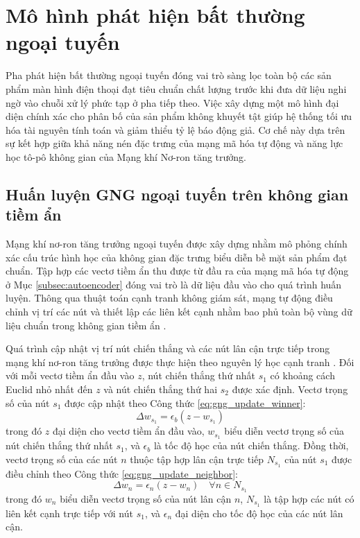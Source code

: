 \section{Mô hình phát hiện bất thường ngoại tuyến}
\label{sec:mo_hinh_bat_thuong_ngoai_tuyen}

Pha phát hiện bất thường ngoại tuyến đóng vai trò sàng lọc toàn bộ các sản phẩm màn hình điện thoại đạt tiêu chuẩn chất lượng trước khi đưa dữ liệu nghi ngờ vào chuỗi xử lý phức tạp ở pha tiếp theo. Việc xây dựng một mô hình đại diện chính xác cho phân bố của sản phẩm không khuyết tật giúp hệ thống tối ưu hóa tài nguyên tính toán và giảm thiểu tỷ lệ báo động giả. Cơ chế này dựa trên sự kết hợp giữa khả năng nén đặc trưng của mạng mã hóa tự động và năng lực học tô-pô không gian của Mạng khí Nơ-ron tăng trưởng.

\subsection{Huấn luyện GNG ngoại tuyến trên không gian tiềm ẩn}
\label{subsec:huan_luyen_gng_ngoai_tuyen}

Mạng khí nơ-ron tăng trưởng ngoại tuyến được xây dựng nhằm mô phỏng chính xác cấu trúc hình học của không gian đặc trưng biểu diễn bề mặt sản phẩm đạt chuẩn. Tập hợp các vectơ tiềm ẩn thu được từ đầu ra của mạng mã hóa tự động ở Mục \ref{subsec:autoencoder} đóng vai trò là dữ liệu đầu vào cho quá trình huấn luyện. Thông qua thuật toán cạnh tranh không giám sát, mạng tự động điều chỉnh vị trí các nút và thiết lập các liên kết cạnh nhằm bao phủ toàn bộ vùng dữ liệu chuẩn trong không gian tiềm ẩn \cite{fritzke1995growing}.

Quá trình cập nhật vị trí nút chiến thắng và các nút lân cận trực tiếp trong mạng khí nơ-ron tăng trưởng được thực hiện theo nguyên lý học cạnh tranh \cite{martinetz1993neural}. Đối với mỗi vectơ tiềm ẩn đầu vào $z$, nút chiến thắng thứ nhất $s_1$ có khoảng cách Euclid nhỏ nhất đến $z$ và nút chiến thắng thứ hai $s_2$ được xác định. Vectơ trọng số của nút $s_1$ được cập nhật theo Công thức \ref{eq:gng_update_winner}:
\begin{equation}
\label{eq:gng_update_winner}
\Delta w_{s_1} = \epsilon_b (z - w_{s_1})
\end{equation}
trong đó $z$ đại diện cho vectơ tiềm ẩn đầu vào, $w_{s_1}$ biểu diễn vectơ trọng số của nút chiến thắng thứ nhất $s_1$, và $\epsilon_b$ là tốc độ học của nút chiến thắng. Đồng thời, vectơ trọng số của các nút $n$ thuộc tập hợp lân cận trực tiếp $N_{s_1}$ của nút $s_1$ được điều chỉnh theo Công thức \ref{eq:gng_update_neighbor}:
\begin{equation}
\label{eq:gng_update_neighbor}
\Delta w_n = \epsilon_n (z - w_n) \quad \forall n \in N_{s_1}
\end{equation}
trong đó $w_n$ biểu diễn vectơ trọng số của nút lân cận $n$, $N_{s_1}$ là tập hợp các nút có liên kết cạnh trực tiếp với nút $s_1$, và $\epsilon_n$ đại diện cho tốc độ học của các nút lân cận.


